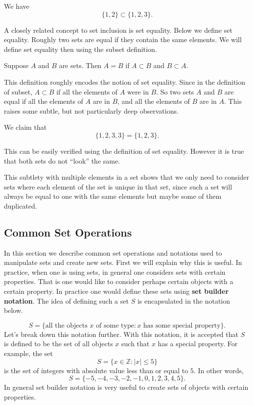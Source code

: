 \begin{example}
We have 
\[\{1, 2\} \subset \{1, 2, 3\}.\]
\end{example}

A closely related concept to set inclusion is set equality. Below we define set equality. Roughly two sets are equal if they contain the same elements. We will define set equality then using the subset definition.
\begin{definition}
Suppose $A$ and $B$ are sets. Then $A = B$ if $A \subset B$ and $B \subset A$.
\end{definition}

This definition roughly encodes the notion of set equality. Since in the definition of subset, $A \subset B$ if all the elements of $A$ were in $B$. So two sets $A$ and $B$ are equal if all the elements of $A$ are in $B$, and all the elements of $B$ are in $A$. This raises some subtle, but not particularly deep observations.

\begin{example}
We claim that 
\[\{1, 2, 3, 3\} = \{1, 2, 3\}.\]

This can be easily verified using the definition of set equality. However it is true that both sets do not ``look'' the same. 
\end{example}

This subtlety with multiple elements in a set shows that we only need to consider sets where each element of the set is unique in that set, since such a set will always be equal to one with the same elements but maybe some of them duplicated. %

\subsection{Common Set Operations}

In this section we describe common set operations and notations used to manipulate sets and create new sets. First we will explain why this is useful. In practice, when one is using sets, in general one considers sets with certain properties. That is one would like to consider perhaps certain objects with a certain property. In practice one would define these sets using \textbf{set builder notation}. The idea of defining such a set $S$ is encapsulated in the notation below.

\[S = \{\text{all the objects $x$ of some type} \colon \text{$x$ has some special property}\}.\]
Let's break down this notation further. With this notation, it is accepted that $S$ is defined to be the set of all objects $x$ such that $x$ has a special property. For example, the set 
\[S = \{x \in \mathbb{Z} \colon |x| \leq 5\}\]
is the set of integers with absolute value less than or equal to $5$. In other words,
\[S = \{-5, -4, -3, -2, -1, 0, 1, 2, 3, 4, 5\}.\]
In general set builder notation is very useful to create sets of objects with certain properties.

